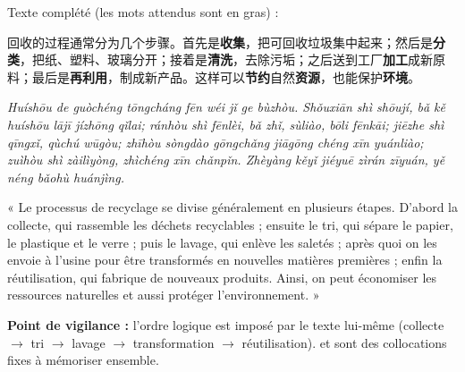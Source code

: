 \documentclass[11pt]{article}
\newcommand{\zh}[1]{\ifmmode\text{#1}\else{#1}\fi}
\begin{document}
\begin{corrige}
Texte complété (les mots attendus sont en gras) :

回收的过程通常分为几个步骤。首先是\textbf{收集}，把可回收垃圾集中起来；然后是\textbf{分类}，把纸、塑料、玻璃分开；接着是\textbf{清洗}，去除污垢；之后送到工厂\textbf{加工}成新原料；最后是\textbf{再利用}，制成新产品。这样可以\textbf{节约}自然\textbf{资源}，也能保护\textbf{环境}。

\emph{Huíshōu de guòchéng tōngcháng fēn wéi jǐ ge bùzhòu. Shǒuxiān shì shōují, bǎ kě huíshōu lājī jízhōng qǐlai; ránhòu shì fēnlèi, bǎ zhǐ, sùliào, bōli fēnkāi; jiēzhe shì qīngxǐ, qùchú wūgòu; zhīhòu sòngdào gōngchǎng jiāgōng chéng xīn yuánliào; zuìhòu shì zàilìyòng, zhìchéng xīn chǎnpǐn. Zhèyàng kěyǐ jiéyuē zìrán zīyuán, yě néng bǎohù huánjìng.}

« Le processus de recyclage se divise généralement en plusieurs étapes. D'abord la collecte, qui rassemble les déchets recyclables ; ensuite le tri, qui sépare le papier, le plastique et le verre ; puis le lavage, qui enlève les saletés ; après quoi on les envoie à l'usine pour être transformés en nouvelles matières premières ; enfin la réutilisation, qui fabrique de nouveaux produits. Ainsi, on peut économiser les ressources naturelles et aussi protéger l'environnement. »

\textbf{Point de vigilance :} l'ordre logique est imposé par le texte lui-même (collecte $\to$ tri $\to$ lavage $\to$ transformation $\to$ réutilisation). \zh{节约资源} et \zh{保护环境} sont des collocations fixes à mémoriser ensemble.
\end{corrige}
\end{document}
